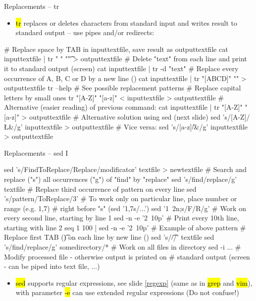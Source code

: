 \documentclass[compress, ucs, xelatex, 11pt, xcolor=svgnames,
  hyperref={
    bookmarks=true,
    unicode=true,
    colorlinks=true,
    pdftitle={Linux, command line and MetaCentrum},
    plainpages=false,
    pdfauthor={Vojtech Zeisek},
    pdfsubject={Course about use of Linux command line, writing shell scripts and using MetaCentrum of CESNET},
    pdfcreator={XeLaTeX},
    pdfkeywords={Linux, GNU, BASH, shell, command line, MetaCentrum},
    linkcolor=Red,
    anchorcolor=Blue,
    citecolor=Purple,
    filecolor=DodgerBlue,
    menucolor=DarkOrchid,
    urlcolor=DeepSkyBlue,
    pdftex},
  url={hyphens, lowtilde} %
  ]{beamer}
\renewcommand{\texttt}[1]{\hl{\ttfamily #1}}
\begin{document}
\begin{frame}[fragile]{Replacements -- tr}
  \begin{itemize}
    \item \texttt{tr} replaces or deletes characters from standard input and writes result to standard output -- use pipes and/or redirects:
  \end{itemize}
  \begin{bashcode}
    # Replace space by TAB in inputtextfile, save result as outputtextfile
    cat inputtextfile | tr " " "\t" > outputtextfile
    # Delete "text" from each line and print it to standard output (screen)
    cat inputtextfile | tr -d "text"
    # Replace every occurrence of A, B, C or D by a new line (\n)
    cat inputtextfile | tr "[ABCD]" "\n" > outputtextfile
    tr --help # See possible replacement patterns
    # Replace capital letters by small ones
    tr "[A-Z]" "[a-z]" < inputtextfile > outputtextfile
    # Alternative (easier reading) of previous command:
    cat inputtextfile | tr "[A-Z]" "[a-z]" > outputtextfile
    # Alternative solution using sed (next slide)
    sed 's/[A-Z]/\L&/g' inputtextfile > outputtextfile # Vice versa:
    sed 's/[a-z]/\U&/g' inputtextfile > outputtextfile
  \end{bashcode}
\end{frame}

\begin{frame}[fragile]{Replacements -- sed I}
  \begin{bashcode}
    sed 's/FindToReplace/Replace/modificator' textfile > newtextfile
    # Search and replace ("s") all occurrences ("g") of "find" by "replace"
    sed 's/find/replace/g' textfile
    # Replace third occurrence of pattern on every line
    sed 's/pattern/ToReplace/3'
    # To work only on particular line, place number or range (e.g. 1,7)
    # right before "s" (sed '1,7s/...')
    sed '1~2n;s/F/R/g' # Work on every second line, starting by line 1
    sed -n -e '2~10p' # Print every 10th line, starting with line 2
    seq 1 100 | sed -n -e '2~10p' # Example of above pattern
    # Replace first TAB (\t) on each line by new line (\n)
    sed 's/\t/\n/' textfile
    sed 's/find/replace/g' somedirectory/* # Work on all files in directory
    sed -i ... # Modify processed file - otherwise output is printed on
               # standard output (screen - can be piped into text file, ...)
  \end{bashcode}
  \begin{itemize}
    \item \texttt{sed} supports regular expressions, see slide \ref{regexp} (same as in \texttt{grep} and \texttt{vim}), with parameter \texttt{-e} can use extended regular expressions (Do not confuse!)
  \end{itemize}
\end{frame}
\end{document}
